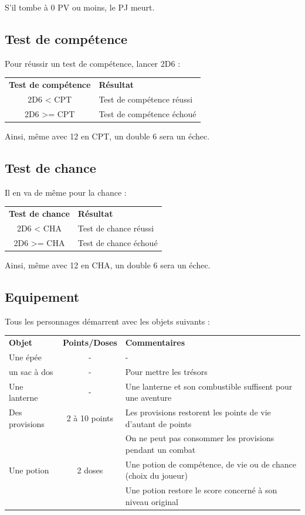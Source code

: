 \documentclass[a4paper, 11pt, twoside]{article}
\begin{document}
S'il tombe à 0 PV ou moins, le PJ meurt.

\newpage

\subsection{Test de compétence}
\label{sec:org749839e}

Pour réussir un test de compétence, lancer 2D6 :

\begin{longtable}{cl}
\textbf{Test de compétence} & \textbf{Résultat}\\
2D6 < CPT & Test de compétence réussi\\
2D6 >= CPT & Test de compétence échoué\\
\end{longtable}

Ainsi, même avec 12 en CPT, un double 6 sera un échec.

\subsection{Test de chance}
\label{sec:org98e79b7}

Il en va de même pour la chance :

\begin{longtable}{cl}
\textbf{Test de chance} & \textbf{Résultat}\\
2D6 < CHA & Test de chance réussi\\
2D6 >= CHA & Test de chance échoué\\
\end{longtable}

Ainsi, même avec 12 en CHA, un double 6 sera un échec.

\subsection{Equipement}
\label{sec:org3fb4560}

Tous les personnages démarrent avec les objets suivants :

\begin{longtable}{lcl}
\textbf{Objet} & \textbf{Points/Doses} & \textbf{Commentaires}\\
Une épée & - & -\\
un sac à dos & - & Pour mettre les trésors\\
Une lanterne & - & Une lanterne et son combustible suffisent pour une aventure\\
Des provisions & 2 à 10 points & Les provisions restorent les points de vie d'autant de points\\
 &  & On ne peut pas consommer les provisions pendant un combat\\
Une potion & 2 doses & Une potion de compétence, de vie ou de chance (choix du joueur)\\
 &  & Une potion restore le score concerné à son niveau original\\
\end{longtable}
\end{document}
